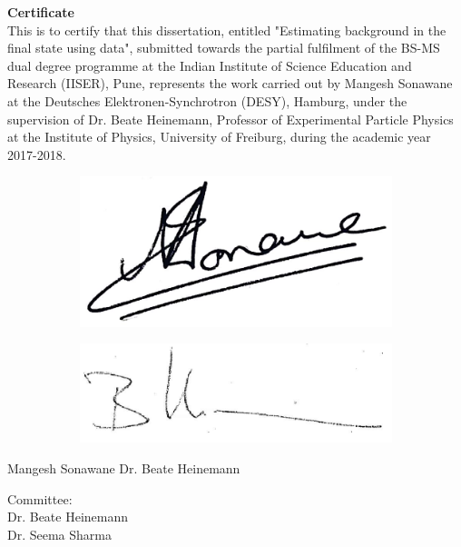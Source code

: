 \Huge \textbf{Certificate\\}
\vspace{1cm}
\normalsize This is to certify that this dissertation, entitled "Estimating \ZZ background in the \llM final state using \Zg data", submitted towards the partial fulfilment of the BS-MS dual degree programme at the Indian Institute of Science Education and Research (IISER), Pune, represents the work carried out by Mangesh Sonawane at the Deutsches Elektronen-Synchrotron (DESY), Hamburg, under the supervision of Dr. Beate Heinemann, Professor of Experimental Particle Physics at the Institute of Physics, University of Freiburg, during the academic year 2017-2018.
\vfill
\begin{figure}[H]
	\hspace{1cm}
	\begin{subfigure}{0.49\textwidth}
	\includegraphics[width=0.4\linewidth]{sign.jpg}
	\end{subfigure}\hspace{1cm}
	\begin{subfigure}{0.49\textwidth}
	\centering
	\includegraphics[width=0.7\linewidth]{Beate_sign.jpg}
	\end{subfigure}
\end{figure}
\begin{center}
Mangesh Sonawane\hspace{8cm}
Dr. Beate Heinemann
\end{center}
\vfill
Committee:\\
Dr. Beate Heinemann\\
Dr. Seema Sharma
\vfill
\vfill
\newpage
\blankpage
\newpage
{}

